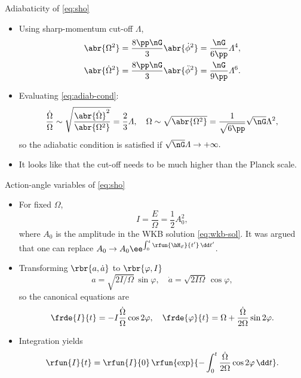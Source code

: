 \documentclass{beamer}
\begin{document}
\begin{frame}{Adiabaticity of \cref{eq:sho}}
\begin{itemize}
\item Using sharp-momentum cut-off $\varLambda$,
\begin{align}
\abr{\Omega^2} &= \frac{8\pp\nG}{3} \abr{{\dot{\phi}}^2} =
\frac{\nG}{6\pp} \varLambda^4,\\
\abr{{\dot\Omega}^2} &= \frac{8\pp\nG}{3} 
\abr{{\ddot{\phi}}^2} = \frac{\nG}{9\pp} \varLambda^6.
\end{align}
\item Evaluating \cref{eq:adiab-cond}:
\begin{equation}
\frac{\dot\Omega}{\Omega} \sim
\sqrt{\frac{\abr{\dot\Omega}^2}{\abr{\Omega^2}}} = \frac{2}{3} 
\varLambda,\quad \Omega \sim \sqrt{\abr{\Omega^2}} = \frac{1}{\sqrt{6\pp}}
\sqrt{\nG}\Lambda^2,
\end{equation}
so the adiabatic condition is satisfied if $\sqrt{\nG}\varLambda \to +\infty.$
\item It looks like that the cut-off needs to be much higher than the Planck 
scale.


\end{itemize}

\end{frame}

\begin{frame}{Action-angle variables of \cref{eq:sho}}
\begin{itemize}
\item For fixed $\Omega$,
\begin{equation}
I = \frac{E}{\Omega} = \frac{1}{2} A_0^2,
\label{eq:I-amp}
\end{equation}
where $A_0$ is the amplitude in the WKB solution \cref{eq:wkb-sol}. It was 
argued that one can replace $A_0 \to A_0 \ee^{\int_0^t \rfun{\hH_{\vec 
x}}{t'}\,\dd t'}$.

\item Transforming $\rbr{a, \dot a}$ to $\rbr{\varphi, I}$
\begin{equation}
a = \sqrt{2I/\Omega}\,\sin\varphi,\quad
\dot a = \sqrt{2I\Omega}\,\cos\varphi,
\label{eq:trsf-aadot}
\end{equation}
so the canonical equations are
\begin{equation}
\frde{I}{t} = -I \frac{\dot \Omega}{\Omega} \cos2\varphi,\quad
\frde{\varphi}{t} = \Omega + \frac{\dot \Omega}{2\Omega}\sin2\varphi.
\end{equation}
\item Integration yields
\begin{equation}
\rfun{I}{t} = \rfun{I}{0}\,\rfun{\exp}{-\int_0^t\frac{\dot\Omega}{2\Omega} 
\cos2\varphi\,\dd t}.
\label{eq:int_I}
\end{equation}


\end{itemize}

\end{frame}
\end{document}
